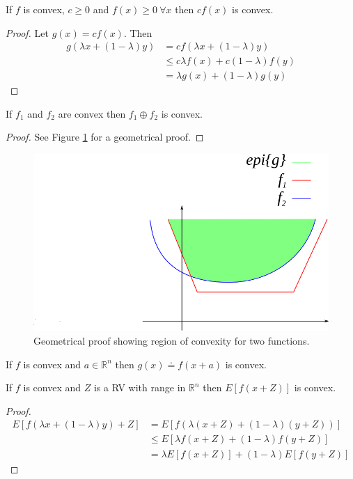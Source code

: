 \begin{theorem}
\label{th:cfxconvex}
If $f$ is convex, $c\geq 0$ and $f(x)\geq 0 ~\forall x$ then $cf(x)$ is convex.
\end{theorem}

\begin{proof}
Let $g(x)=cf(x)$. Then
\begin{align*}
g(\lambda x+(1-\lambda)y) &= cf(\lambda x+(1-\lambda)y) \\
&\leq c\lambda f(x) + c(1-\lambda)f(y) \\
&= \lambda g(x) + (1-\lambda)g(y)
\end{align*}
\end{proof}

\begin{theorem}
\label{th:maxconvex}
If $f_1$ and $f_2$ are convex then $f_1\oplus f_2$ is convex.
\end{theorem}

\begin{proof}
See Figure \ref{fig:05convexOplusProof} for a geometrical proof.
\end{proof}

\begin{figure}[ht!]
	\centering
	\includegraphics[width=.4\textwidth]{images/05convexOplusProof}
	\caption{Geometrical proof showing region of convexity for two functions.}
	\label{fig:05convexOplusProof}
\end{figure}

\begin{theorem}
\label{th:argconvex}
If $f$ is convex and $a\in\mathbb{R}^n$ then $g(x)\doteq f(x+a)$ is convex.
\end{theorem}

\begin{theorem}
\label{th:randconvex}
If $f$ is convex and $Z$ is a RV with range in $\mathbb{R}^n$ then $E[f(x+Z)]$ is convex.
\end{theorem}

\begin{proof}
\begin{align*}
E[f(\lambda x+(1-\lambda)y) + Z] &= E[f(\lambda(x+Z) + (1-\lambda)(y+Z))] \\
&\leq E[\lambda f(x+Z) + (1-\lambda)f(y+Z)] \\
&= \lambda E[f(x+Z)] + (1-\lambda)E[f(y+Z)]
\end{align*}
\end{proof}

